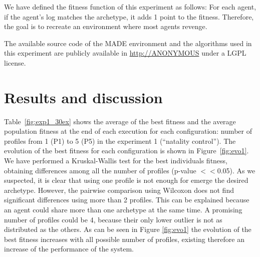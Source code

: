 \documentclass[runningheads]{llncs}
\begin{document}
We have defined the fitness function of this experiment as follows:
For each agent, if the agent's log matches the archetype, it adds 1 point to the fitness. Therefore, the goal is to recreate an environment where most agents revenge.

The available source code of the MADE environment and the algorithms used in this experiment are publicly available in \url{http://ANONYMOUS} under a LGPL license. %

\section{Results and discussion}
\label{sec:results}

Table~\ref{fig:exp1_30ex} shows the average of the best fitness and the average population fitness at the end of each execution for each configuration: number of profiles from 1 (P1) to 5 (P5) in the experiment 1 (``natality control'').
The evolution of the best fitness for each configuration is shown in Figure~\ref{fig:evo1}. We have performed a Kruskal-Wallis test for the best individuals fitness, obtaining differences among all the number of profiles (p-value $<<$0.05). As we suspected, it is clear that using one profile is not enough for emerge the desired archetype. However, the pairwise comparison using Wilcoxon does not find significant differences using more than 2 profiles. This can be explained because an agent could share more than one archetype at the same time.  A promising number of profiles could be 4, because their only lower outlier is not as distributed as the others. As can be seen in Figure \ref{fig:evo1} the evolution of the best fitness increases with all possible number of profiles, existing therefore an increase of the performance of the system.
\end{document}
